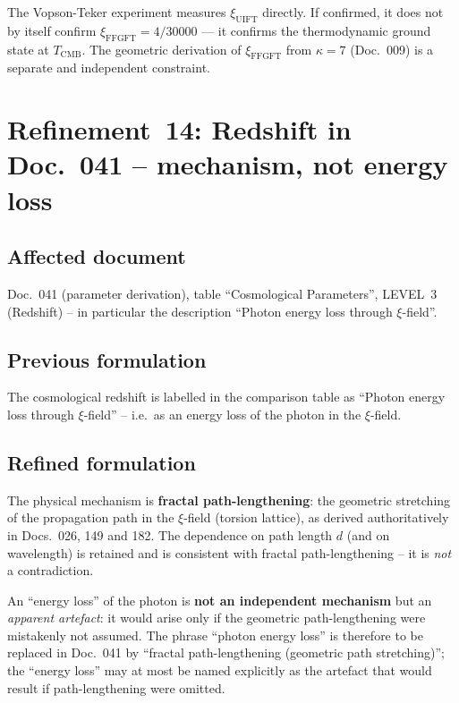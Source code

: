 The Vopson-Teker experiment measures $\xi_\text{UIFT}$ directly.
If confirmed, it does not by itself confirm $\xi_\text{FFGFT} = 4/30000$
— it confirms the thermodynamic ground state at $T_\text{CMB}$.
The geometric derivation of $\xi_\text{FFGFT}$ from $\kappa = 7$ (Doc.~009)
is a separate and independent constraint.


\section{\texorpdfstring{Refinement~14: Redshift in Doc.~041 -- mechanism, not energy loss}{Refinement 14: Redshift in Doc. 041 -- mechanism, not energy loss}}

\subsection*{Affected document}

Doc.~041 (parameter derivation), table \enquote{Cosmological Parameters},
LEVEL~3 (Redshift) -- in particular the description
\enquote{Photon energy loss through $\xi$-field}.

\subsection*{Previous formulation}

The cosmological redshift is labelled in the comparison table as
\enquote{Photon energy loss through $\xi$-field} -- i.e.\ as an energy
loss of the photon in the $\xi$-field.

\subsection*{Refined formulation}

The physical mechanism is \textbf{fractal path-lengthening}: the geometric
stretching of the propagation path in the $\xi$-field (torsion lattice), as
derived authoritatively in Docs.~026, 149 and 182. The dependence on path
length $d$ (and on wavelength) is retained and is consistent with fractal
path-lengthening -- it is \emph{not} a contradiction.

An \enquote{energy loss} of the photon is \textbf{not an independent
mechanism} but an \emph{apparent artefact}: it would arise only if the
geometric path-lengthening were mistakenly not assumed. The phrase
\enquote{photon energy loss} is therefore to be replaced in Doc.~041 by
\enquote{fractal path-lengthening (geometric path stretching)}; the
\enquote{energy loss} may at most be named explicitly as the artefact that
would result if path-lengthening were omitted.

